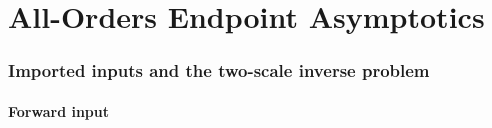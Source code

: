 
\part{All-Orders Endpoint Asymptotics}


\section{Imported inputs and the two-scale inverse problem}
\label{ao:sec:inputs}

\subsection{Forward input}

